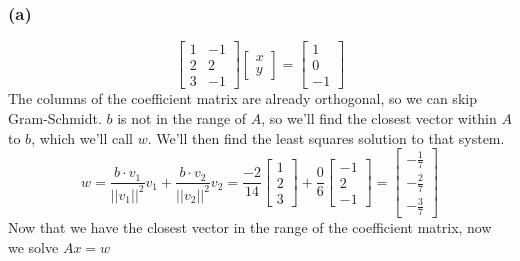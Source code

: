 \documentclass[10pt,letterpaper]{article}
\begin{document}
	\subsubsection*{(a)} 
	$$
	\begin{bmatrix}
	1 & -1 \\ 2 & 2 \\ 3 & -1
	\end{bmatrix} \begin{bmatrix}
	x \\ y
	\end{bmatrix} = \begin{bmatrix}
	1 \\ 0 \\ -1
	\end{bmatrix}
	$$
	The columns of the coefficient matrix are already orthogonal, so we can skip Gram-Schmidt. $b$ is not in the range of $A$, so we'll find the closest vector within $A$ to $b$, which we'll call $w$. We'll then find the least squares solution to that system. 
	$$
	w = \frac{b \cdot v_1 }{||v_1||^2}v_1 + \frac{b \cdot v_2}{||v_2||^2}v_2 = \frac{-2}{14} \begin{bmatrix}
	1 \\ 2 \\ 3
	\end{bmatrix} + \frac{0}{6} \begin{bmatrix}
	-1 \\ 2 \\ -1
	\end{bmatrix} = \begin{bmatrix}
	-\frac{1}{7} \\ -\frac{2}{7} \\ -\frac{3}{7}
	\end{bmatrix}
	$$
	Now that we have the closest vector in the range of the coefficient matrix, now we solve $Ax=w$
	
\end{document}
